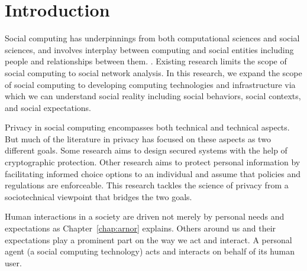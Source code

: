 \chapter{Introduction}
\label{chap:intro}

\begin{tcolorbox}[width=\columnwidth,
    tikznode boxed title,
    enhanced,
    interior style={white},
    boxsep=3pt,left=3pt,right=3pt,bottom=2pt,
    width=\columnwidth,
    boxrule=1pt,
    attach boxed title to top center= {yshift=-\tcboxedtitleheight/2},
    colbacktitle=white,coltitle=black,
    boxed title style={size=normal,colframe=white,boxrule=0pt},
    title={My Thesis},
    ]%
\end{tcolorbox}

Social computing has underpinnings from both computational sciences and social sciences, and involves interplay between computing and social entities including people and relationships between them. \citep{wang2007social}. 
Existing research limits the scope of social computing to social network analysis. 
In this research, we expand the scope of social computing to developing computing technologies and infrastructure via which we can understand social reality including social behaviors, social contexts, and social expectations. 

Privacy in social computing encompasses both technical and technical aspects. But much of the
literature in privacy has focused on these aspects as two
different goals.  Some research aims to design secured systems with the help of
cryptographic protection. Other research aims to protect personal information
by facilitating informed choice options to an individual and assume that
policies and regulations are enforceable. This research tackles
the science of privacy from a sociotechnical viewpoint that bridges the 
two goals.

Human interactions in a society are driven not merely by personal needs
and expectations as Chapter~\ref{chap:arnor} explains. 
Others around us and their expectations play a
prominent part on the way we act and interact. A personal agent (a social computing technology) acts and
interacts on behalf of its human user. 

